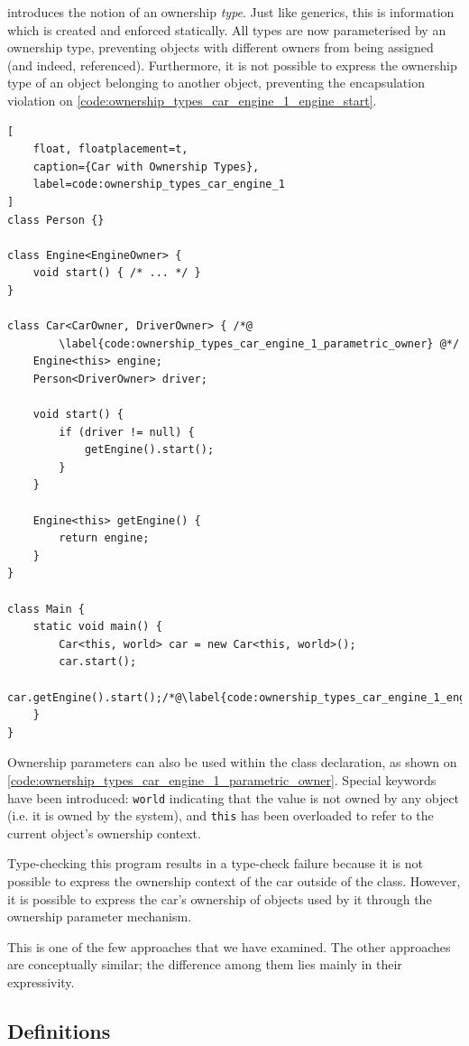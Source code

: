 \documentclass{acm_proc_article-sp}
\begin{document}
 introduces the notion of an ownership
\emph{type}. Just like generics, this is information which is created and
enforced statically. All types are now parameterised by an ownership type,
preventing objects with different owners from being assigned (and indeed,
referenced). Furthermore, it is not possible to express the ownership type of
an object belonging to another object, preventing the encapsulation violation
on \cref{code:ownership_types_car_engine_1_engine_start}.

\begin{lstlisting}[
	float, floatplacement=t,
	caption={Car with Ownership Types},
	label=code:ownership_types_car_engine_1
]
class Person {}

class Engine<EngineOwner> {
	void start() { /* ... */ }
}

class Car<CarOwner, DriverOwner> { /*@
		\label{code:ownership_types_car_engine_1_parametric_owner} @*/
	Engine<this> engine;
	Person<DriverOwner> driver; 

	void start() {
		if (driver != null) {
			getEngine().start();
		}
	}

	Engine<this> getEngine() {
		return engine;
	}
}

class Main {
	static void main() {
		Car<this, world> car = new Car<this, world>();
		car.start();
		car.getEngine().start();/*@\label{code:ownership_types_car_engine_1_engine_start}@*/
	}
}
\end{lstlisting}

Ownership parameters can also be used within the class declaration, as shown on
\cref{code:ownership_types_car_engine_1_parametric_owner}. Special keywords
have been introduced: \lstinline|world| indicating that the value is not owned
by any object (i.e. it is owned by the system), and \lstinline|this| has been
overloaded to refer to the current object's ownership context.

Type-checking this program results in a type-check failure because it is not
possible to express the ownership context of the car outside of the class.
However, it is possible to express the car's ownership of objects used by it
through the ownership parameter mechanism.

This is one of the few approaches that we have examined. The other approaches
are conceptually similar; the difference among them lies mainly in their
expressivity.

\subsection{Definitions}
\label{subsec:definitions}
\end{document}
